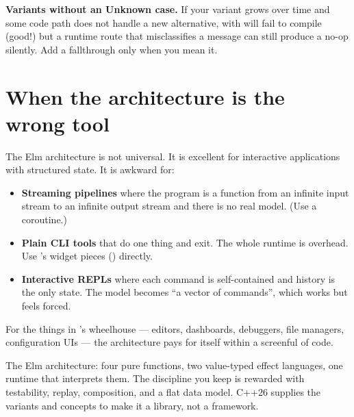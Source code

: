 \begin{warning}
\textbf{Variants without an Unknown case.} If your 
variant grows over time and some code path does not handle a new
alternative,  with  will fail to
compile (good!) but a runtime route that misclassifies a message
can still produce a no-op silently. Add a fallthrough
 only when you mean it.
\end{warning}

\section{When the architecture is the wrong tool}

The Elm architecture is not universal. It is excellent for
interactive applications with structured state. It is awkward for:

\begin{itemize}[leftmargin=*]
  \item \textbf{Streaming pipelines} where the program is a
    function from an infinite input stream to an infinite output
    stream and there is no real model. (Use a coroutine.)
  \item \textbf{Plain CLI tools} that do one thing and exit.
    The whole runtime is overhead. Use \maya{}'s widget pieces
    () directly.
  \item \textbf{Interactive REPLs} where each command is
    self-contained and history is the only state. The model
    becomes ``a vector of commands'', which works but feels
    forced.
\end{itemize}

For the things in \maya{}'s wheelhouse --- editors, dashboards,
debuggers, file managers, configuration UIs --- the architecture
pays for itself within a screenful of code.

\begin{recap}
The Elm architecture: four pure functions, two value-typed effect
languages, one runtime that interprets them. The discipline you
keep is rewarded with testability, replay, composition, and a
flat data model. C++26 supplies the variants and concepts to make
it a library, not a framework.
\end{recap}
